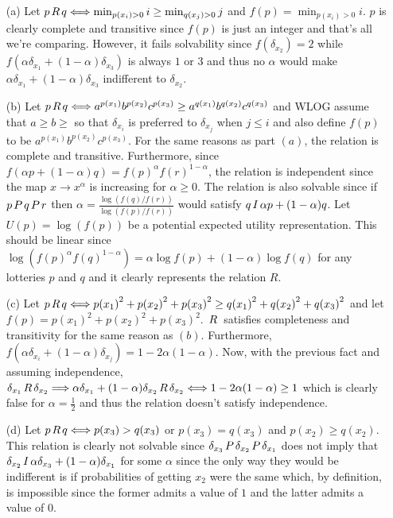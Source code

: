 \documentclass[11pt,oneside]{article}
\numberwithin{equation}{section}
\theoremstyle{definition}
\def\r{\hspace*{0.5mm} R \hspace*{0.5mm} }
\def\I{\hspace*{0.5mm} I \hspace*{0.5mm} }
\def\P{\hspace*{0.5mm} P \hspace*{0.5mm} }
\newcommand{\IFF}{\Longleftrightarrow}
\newcommand{\RIGHT}{\Longrightarrow}
\begin{document}
\begin{solution}

\begin{enumerate}

\item[(a)] Let $p \r q \IFF \min_{p(x_i)>0}i \geq  \min_{q(x_j)>0}j$ and $f(p) = \min_{p(x_i)>0}i$. $p$ is clearly complete and transitive since $f(p)$ is just an integer and that's all we're comparing. However, it fails solvability since $f(\delta_{x_2}) = 2$ while $f(\alpha \delta_{x_1} + (1-\alpha) \delta_{x_3})$ is always $1$ or $3$ and thus no $\alpha$ would make $\alpha \delta_{x_1} + (1-\alpha) \delta_{x_3}$ indifferent to $\delta_{x_2}$.

\item[(b)] Let  $p \r q \IFF a^{p(x_1)} b^{p(x_2)} c^{p(x_3)} \geq a^{q(x_1)} b^{q(x_2)} c^{q(x_3)}$ and WLOG assume that $a \geq b \geq $ so that $\delta_{x_i}$ is preferred to $\delta_{x_j}$ when $j \leq i$ and also define $f(p)$ to be $a^{p(x_1)} b^{p(x_2)} c^{p(x_3)}$. For the same reasons as part $(a)$, the relation is complete and transitive. Furthermore, since $f(\alpha p + (1-\alpha) q) = {f(p)}^{\alpha} {f(r)}^{1-\alpha} $, the relation is independent since the map $x \to x^{\alpha}$ is increasing for $\alpha \geq 0$. The relation is also solvable since if $p \P q \P r$ then $\alpha = \frac{\log(f(q)/f(r))}{\log(f(p)/f(r))}$ would satisfy $q \I \alpha p + (1-\alpha) q$. Let $U(p) = \log(f(p))$ be a potential expected utility representation. This  should be linear since $\log({f(p)}^{\alpha} {f(q)}^{1-\alpha}) = \alpha \log f(p) + (1-\alpha )\log f(q)$ for any lotteries $p$ and $q$ and it clearly represents the relation $R$. 
\item[(c)] Let $p \r q \IFF {p(x_1)}^2 + {p(x_2)}^2 + {p(x_3)}^2 \geq {q(x_1)}^2 + {q(x_2)}^2 + {q(x_3)}^2$ and let $f(p) ={p(x_1)}^2 + {p(x_2)}^2 + {p(x_3)}^2 $. $\r$ satisfies completeness and transitivity for the same reason as $(b)$. Furthermore, $f(\alpha \delta_{x_i} + (1-\alpha) \delta_{x_j}) = 1 - 2\alpha(1-\alpha)$. Now, with the previous fact and assuming independence, $\delta_{x_1} \r \delta_{x_2} \RIGHT \alpha \delta_{x_1} + (1-\alpha) \delta_{x_2} \r \delta_{x_2} \IFF 1 - 2 \alpha (1-\alpha) \geq 1$ which is clearly false for $\alpha = \frac{1}{2}$ and thus the relation doesn't satisfy independence. 
\item[(d)] Let $p \r q \IFF p(x_3) > q(x_3)$ or $p(x_3) = q(x_3)$ and $p(x_2) \geq q(x_2)$. This relation is clearly not solvable since $\delta_{x_3} \P \delta_{x_2} \P \delta_{x_1}$ does not imply that $\delta_{x_2} \I \alpha \delta_{x_3} + (1-\alpha) \delta_{x_1}$ for some $\alpha$ since the only way they would be indifferent is if probabilities of getting $x_2$ were the same which, by definition, is impossible since the former admits a value of $1$ and the latter admits a value of $0$. 


\end{enumerate}

\end{solution}
\end{document}
